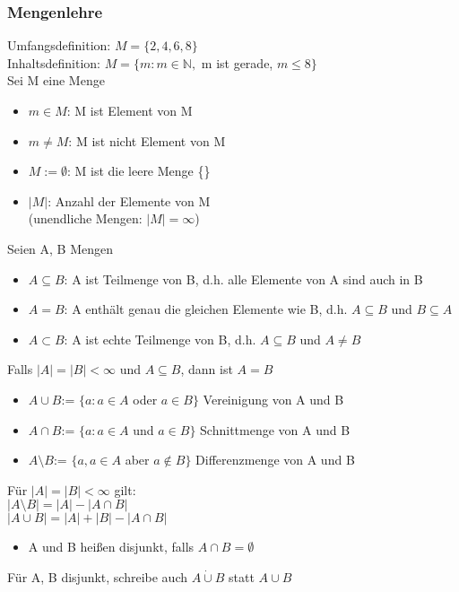 \documentclass{article}
\begin{document}
	\subsubsection{Mengenlehre}
	Umfangsdefinition: $M = \{2, 4, 6, 8\}$ \\
	Inhaltsdefinition: $M = \{m: m \in \mathbb{N},$ m ist gerade, $ m \leq 8 \}$ \\
	Sei M eine Menge
	\begin{itemize}
	\item $m \in M$: M ist Element von M
	\item $m \neq M$: M ist nicht Element von M
	\item $M := \emptyset$: M ist die leere Menge \{\}
	\item $| M |$: Anzahl der Elemente von M \\
	(unendliche Mengen: $| M | = \infty$)
	\end{itemize}
	Seien A, B Mengen
	\begin{itemize}
	\item $A \subseteq B $: A ist Teilmenge von B, d.h. alle Elemente von A sind auch in B
	\item $A = B $: A enthält genau die gleichen Elemente wie B, d.h. $A \subseteq B$ und $B \subseteq A$
	\item $A \subset B $: A ist echte Teilmenge von B, d.h. $A \subseteq B$ und $A \neq B$
	\end{itemize}
	Falls $| A | = | B | < \infty$ und $A \subseteq B$, dann ist $A = B$
	\begin{itemize}
	\item $A \cup B$:= $\{a: a \in A$ oder $a \in B\}$ 
	Vereinigung von A und B
	\item $A \cap B$:= $\{a: a \in A$ und $a \in B\}$ Schnittmenge von A und B
	\item $A \setminus B$:= $\{a, a \in A$ aber $a \notin B\}$ Differenzmenge von A und B
	\end{itemize}
	Für $| A | = | B | < \infty$ gilt: \\
	$| A \setminus B | = | A | - | A \cap B | $ \\
	$| A \cup B | = | A | + | B | - | A \cap B |$
	\begin{itemize}
	\item A und B heißen disjunkt, falls $A \cap B = \emptyset$
	\end{itemize}
	Für A, B disjunkt, schreibe auch $A \dot\cup B$ statt $A \cup B$
\end{document}

